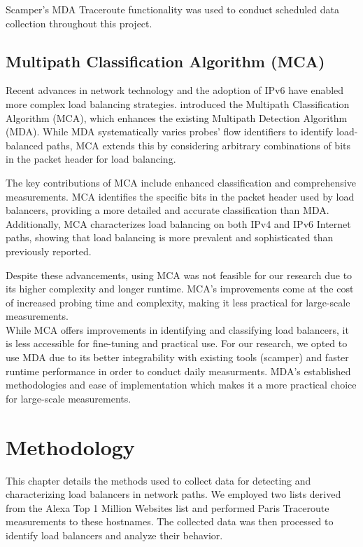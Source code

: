 \documentclass[12pt]{cwru_thesis}
\begin{document}
Scamper's MDA Traceroute functionality was used to conduct scheduled data collection throughout this project.

\section{Multipath Classification Algorithm (MCA)}

Recent advances in network technology and the adoption of IPv6 have enabled more complex load balancing strategies.  \cite{9155387} introduced the Multipath Classification Algorithm (MCA), which enhances the existing Multipath Detection Algorithm (MDA). While MDA systematically varies probes' flow identifiers to identify load-balanced paths, MCA extends this by considering arbitrary combinations of bits in the packet header for load balancing.

The key contributions of MCA include enhanced classification and comprehensive measurements. MCA identifies the specific bits in the packet header used by load balancers, providing a more detailed and accurate classification than MDA. Additionally, MCA characterizes load balancing on both IPv4 and IPv6 Internet paths, showing that load balancing is more prevalent and sophisticated than previously reported.


Despite these advancements, using MCA was not feasible for our research due to its higher complexity and longer runtime. MCA's improvements come at the cost of increased probing time and complexity, making it less practical for large-scale measurements.\\



While MCA offers improvements in identifying and classifying load balancers, it is less accessible for fine-tuning and practical use. For our research, we opted to use MDA due to its better integrability with existing tools (scamper) and faster runtime performance in order to conduct daily measurments. MDA's established methodologies and ease of implementation which makes it a more practical choice for large-scale measurements. 
 

\chapter{Methodology}

This chapter details the methods used to collect data for detecting and characterizing load balancers in network paths. We employed two lists derived from the Alexa Top 1 Million Websites list and performed Paris Traceroute measurements to these hostnames. The collected data was then processed to identify load balancers and analyze their behavior.
\end{document}
